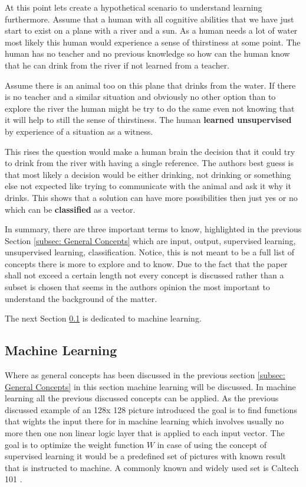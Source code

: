 \documentclass[conference]{IEEEtran}
\begin{document}
At this point lets create a hypothetical scenario to understand learning furthermore. Assume that a human with all cognitive abilities that we have just start to exist on a plane with a river and a sun. As a human needs a lot of water most likely this human would experience a sense of thirstiness at some point. The human has no teacher and no previous knowledge so how can the human know that he can drink from the river if not learned from a teacher.

Assume there is an animal too on this plane that drinks from the water. If there is no teacher and a similar situation and obviously no other option than to explore the river the human might be try to do the same even not knowing that it will help to still the sense of thirstiness. The human \textbf{learned unsupervised} by experience of a situation as a witness.

This rises the question would make a human brain the decision that it could try to drink from the river with having a single reference. The authors best guess is that most likely a decision would be either drinking, not drinking or something else not expected like trying to communicate with the animal and ask it why it drinks. This shows that a solution can have more possibilities then just yes or no which can be \textbf{classified} as a vector. 

In summary, there are three important terms to know, highlighted in the previous Section \ref{subsec: General Concepts} which are input, output, supervised learning, unsupervised learning, classification. Notice, this is not meant to be a full list of concepts there is more to explore and to know. Due to the fact that the paper shall not exceed a certain length not every concept is discussed rather than a subset is chosen that seems in the authors opinion the most important to understand the background of the matter. 

The next Section \ref{subsec: Machine Learning} is dedicated to machine learning. 

\subsection{Machine Learning}\label{subsec: Machine Learning}
Where as general concepts has been discussed in the previous section \ref{subsec: General Concepts} in this section machine learning will be discussed. In machine learning all the previous discussed concepts can be applied. As the previous discussed example of an 128x 128 picture introduced the goal is to find functions that wights the input there for in machine learning which involves usually no more then one non linear logic layer that is applied to each input vector. The goal is to optimize the weight function $W$ in case of using the concept of supervised learning it would be a predefined set of pictures with known result that is instructed to machine. A commonly known and widely used set is Caltech 101 \cite{Caltech101}. 
\end{document}
